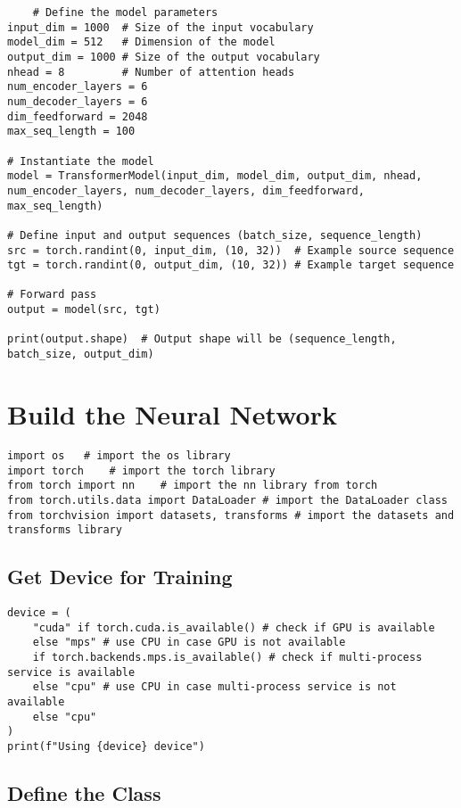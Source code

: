 \documentclass{article}
\begin{document}
\begin{lstlisting}
    # Define the model parameters
input_dim = 1000  # Size of the input vocabulary
model_dim = 512   # Dimension of the model
output_dim = 1000 # Size of the output vocabulary
nhead = 8         # Number of attention heads
num_encoder_layers = 6
num_decoder_layers = 6
dim_feedforward = 2048
max_seq_length = 100

# Instantiate the model
model = TransformerModel(input_dim, model_dim, output_dim, nhead, num_encoder_layers, num_decoder_layers, dim_feedforward, max_seq_length)

# Define input and output sequences (batch_size, sequence_length)
src = torch.randint(0, input_dim, (10, 32))  # Example source sequence
tgt = torch.randint(0, output_dim, (10, 32)) # Example target sequence

# Forward pass
output = model(src, tgt)

print(output.shape)  # Output shape will be (sequence_length, batch_size, output_dim)
\end{lstlisting}

\section{Build the Neural Network}

\begin{lstlisting}
import os   # import the os library
import torch    # import the torch library
from torch import nn    # import the nn library from torch
from torch.utils.data import DataLoader # import the DataLoader class
from torchvision import datasets, transforms # import the datasets and transforms library
\end{lstlisting}

\subsection{Get Device for Training}

\begin{lstlisting}
device = (
    "cuda" if torch.cuda.is_available() # check if GPU is available
    else "mps" # use CPU in case GPU is not available
    if torch.backends.mps.is_available() # check if multi-process service is available
    else "cpu" # use CPU in case multi-process service is not available
    else "cpu"
)
print(f"Using {device} device")
\end{lstlisting}

\subsection{Define the Class}
\end{document}
